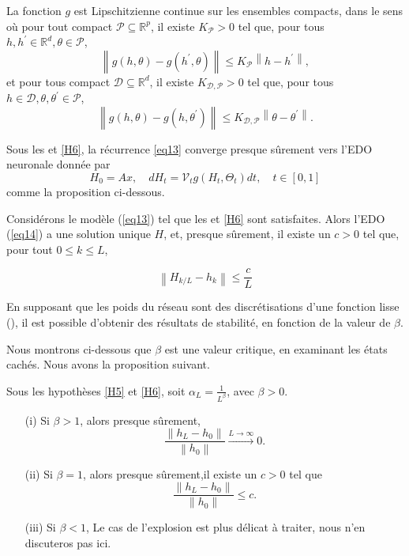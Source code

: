 \begin{assumption}\label{H6}
La fonction $g$ est Lipschitzienne continue sur les ensembles compacts, dans le sens où pour tout compact $\mathscr{P} \subseteq \mathbb{R}^p$, il existe $K_{\mathscr{P}} > 0$  tel que, pour tous $h, h^{\prime} \in \mathbb{R}^d, \theta \in \mathscr{P}$,
$$
    \left\|g(h, \theta)-g\left(h^{\prime}, \theta\right)\right\| \leqslant K_{\mathscr{P}}\left\|h-h^{\prime}\right\|,
$$
et pour tous compact $\mathscr{D} \subseteq \mathbb{R}^d$, il existe $K_{\mathscr{D}, \mathscr{P}}>0$ tel que, pour tous $h \in \mathscr{D}, \theta, \theta^{\prime} \in \mathscr{P}$,
$$
    \left\|g(h, \theta)-g\left(h, \theta^{\prime}\right)\right\| \leqslant K_{\mathscr{D}, \mathscr{P}}\left\|\theta-\theta^{\prime}\right\| .
$$
\end{assumption}


Sous les  et \ref{H6}, la récurrence \ref{eq13} converge presque sûrement vers l'EDO neuronale donnée par
\begin{equation}\label{eq14}
    H_0=A x, \quad d H_t=\mathscr{V}_t g\left(H_t, \Theta_t\right) d t, \quad t \in[0,1]
\end{equation}
comme la proposition ci-dessous.

\begin{proposition}\label{prop11}
    Considérons le modèle (\ref{eq13}) tel que les  et \ref{H6} sont satisfaites. Alors l'EDO (\ref{eq14}) a une solution unique $H$, et, presque sûrement, il existe un $c > 0$
    tel que, pour tout $0 \leqslant k \leqslant L$,

    \begin{equation}  
    \left\|H_{k / L}-h_k\right\| \leqslant \frac{c}{L}
    \end{equation}
\end{proposition}

En supposant que les poids du réseau sont des discrétisations d'une fonction lisse (), il est possible d'obtenir des résultats de stabilité, en fonction de la valeur de $\beta$.

Nous montrons ci-dessous que $\beta$ est une valeur critique, en examinant les états cachés. Nous avons la proposition suivant.

\begin{proposition}\label{prop12}
    Sous les hypothèses \ref{H5} et \ref{H6}, soit $\alpha_L = \frac{1}{L^{\beta}}$, avec $\beta >0 $.
    \begin{itemize}
        \item [(i)] Si $\beta > 1 $, alors presque sûrement, 
            \[
                \frac{\left\| h_L - h_0 \right\| }{\left\| h_0 \right\| } \xrightarrow{L \to \infty } 0 
            .\]
        \item [(ii)] Si $\beta = 1 $, alors presque sûrement,il existe un $c > 0$ tel que
            \[
                \frac{\left\| h_L - h_0 \right\| }{\left\| h_0 \right\| } \leqslant c
            .\]
        \item [(iii)] Si $\beta < 1 $, Le cas de l'explosion est plus délicat à traiter, nous n'en discuteros pas ici.
    \end{itemize}
\end{proposition}

